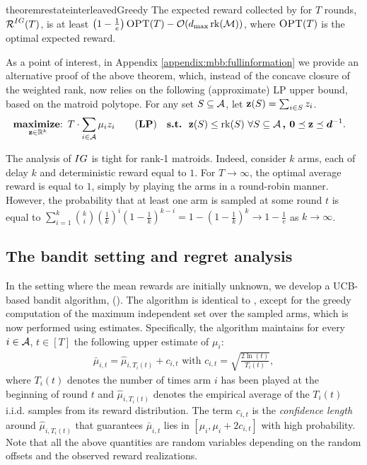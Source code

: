 \begin{restatable}{theorem}{restateinterleavedGreedy}\label{thm:interleavedGreedy}
The expected reward collected by \ig for $T$ rounds, $\operatorname{\mathcal{R}}^{IG}(T)$, is at least
$
\left(1 - \frac{1}{e} \right) \textsc{OPT}(T) - \mathcal{O}(d_{\max} \operatorname{rk}(\operatorname{\mathcal{M}}))
$, where $\textsc{OPT}(T)$ is the optimal expected reward.
\end{restatable}

As a point of interest, in Appendix \ref{appendix:mbb:fullinformation} we provide an alternative proof of the above theorem, which, instead of the concave closure of the weighted rank, now relies on the following (approximate) LP upper bound, based on the matroid polytope. For any set $S \subseteq \operatorname{\mathcal{A}}$, let $\operatorname{\mathbf{z}}(S) = \sum_{i \in S} z_i$.
\begin{align}
&\maximize_{\z \in \mathbb{R}^k} ~T \cdot \sum_{i \in \A} \mu_{i} z_{i} \tag{\textbf{LP}} \quad 
\textbf{s.t. } \z(S) \leq \rk(S)~ \forall S\subseteq \A
\textbf{, } \bm{0} \preceq \z \preceq \bm{d}^{-1}.
\end{align}

\begin{remark}
The analysis of $IG$ is tight for rank-1 matroids. Indeed, consider $k$ arms, each of delay $k$ and deterministic reward equal to $1$. For $T \to \infty$, the optimal average reward is equal to $1$, simply by playing the arms in a round-robin manner. However, the probability that at least one arm is sampled at some round $t$ is equal to $\sum^k_{i = 1} {k \choose i} \left(\frac{1}{k}\right)^i \left(1 - \frac{1}{k}\right)^{k - i} = 1 - \left(1 - \frac{1}{k}\right)^k \to 1 - \frac{1}{e}$ as $k \to \infty$.
\end{remark}

\subsection{The bandit setting and regret analysis}

In the setting where the mean rewards are initially unknown, we develop a UCB-based bandit algorithm, \ucb (\UCB). The algorithm is identical to \IG, except for the greedy computation of the maximum independent set over the sampled arms, which is now performed using estimates. Specifically, the algorithm maintains for every $i \in \operatorname{\mathcal{A}}$, $t \in [T]$ the following upper estimate of $\mu_i$:
\vspace{-0.5em}
\begin{align*}
\bar{\mu}_{i,t} = \hat{\mu}_{i,T_{i}(t)} + c_{i,t}\text{  with  } c_{i,t} = \sqrt{\frac{2 \ln{(t)}}{T_{i}(t)}},
\end{align*}
where $T_{i}(t)$ denotes the number of times arm $i$ has been played at the beginning of round $t$ and $\hat{\mu}_{i,T_{i}(t)}$ denotes the empirical average of the $T_{i}(t)$ i.i.d. samples from its reward distribution. The term $c_{i,t}$ is the {\em confidence length} around $\hat{\mu}_{i,T_{i}(t)}$ that guarantees $\bar{\mu}_{i,t}$  lies in $[\mu_i, \mu_i + 2c_{i,t}]$ with high probability. Note that all the above quantities are random variables depending on the random offsets and the observed reward realizations.

